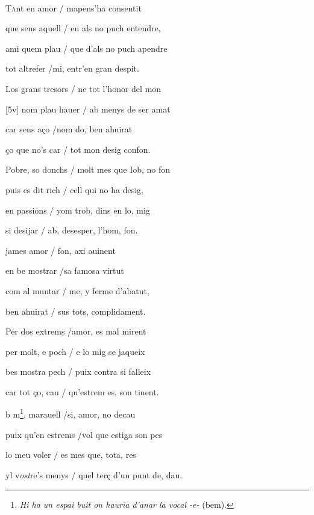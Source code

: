 \documentclass[12pt]{article}
\renewcommand{\espaiAbansEtiquetaPoema}{\vspace{0ex}}
\begin{document}
\begin{estrofa}

\espaiAbansEtiquetaPoema

\\

\end{estrofa}


\begin{estrofa}

 \textsc{Ta}nt en amor / mapens'ha consentit

 que sens aquell / en als no puch entendre,

 ami quem plau / que d'als no puch apendre

 tot altrefer /mi, entr'en gran despit.

 Los grans tresors / ne tot l'honor del mon

 [5v] nom plau hauer / ab menys de ser amat

 car sens a\c{c}o /nom do, ben ahuirat

 \c{c}o que no's car / tot mon desig confon.

\end{estrofa}



\begin{estrofa}

 Pobre, so donchs / molt mes que Iob, no fon

 puis es dit rich / cell qui no ha desig,

 en passions / yom trob, dins en lo, mig

 si desijar / ab, desesper, l'hom, fon.

 james amor / fon, axi auinent

 en be mostrar /sa famosa virtut

 com al muntar / me, y ferme d'abatut,

 ben ahuirat / sus tots, complidament.

\end{estrofa}



\begin{estrofa}

 Per dos extrems /amor, es mal mirent

 per molt, e poch / e lo mig se jaqueix

 bes mostra pech / puix contra si falleix

 car tot \c{c}o, cau / qu'estrem es, son tinent.

 b m\footnote{\textit{Hi ha un espai buit on hauria d'anar la vocal -e-} (bem).},
marauell /si, amor, no decau

 puix qu'en estrems /vol que estiga son pes

 lo meu voler / es mes que, tota, res

 yl v\textit{ost}re's menys / quel ter\c{c} d'un punt de, dau.

\end{estrofa}
\end{document}
